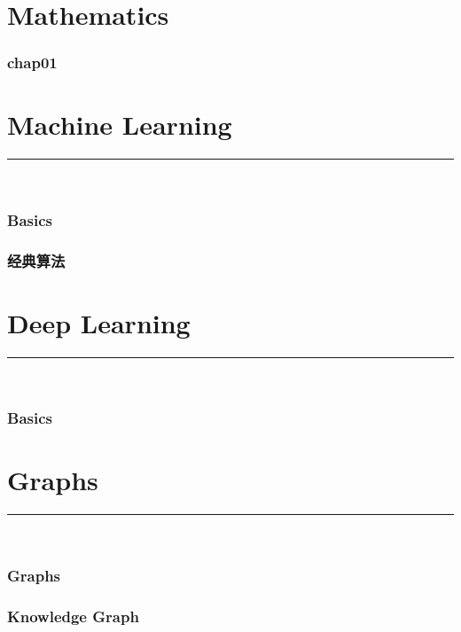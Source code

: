 \documentclass{article}
\begin{document}
% 
\part{Mathematics}
\section{chap01}



\clearpage
\part{Machine Learning}
{\noindent}	 \rule[-10pt]{17.5cm}{0.5em}\\  %
\section{Basics}

\section{经典算法}



\clearpage
\part{Deep Learning}
{\noindent}	 \rule[-10pt]{17.5cm}{0.5em}\\ 
\section{Basics}



\clearpage
\part{Graphs}
{\noindent}	 \rule[-10pt]{17.5cm}{0.5em}\\
\section{Graphs}


\section{Knowledge Graph}

\end{document}
